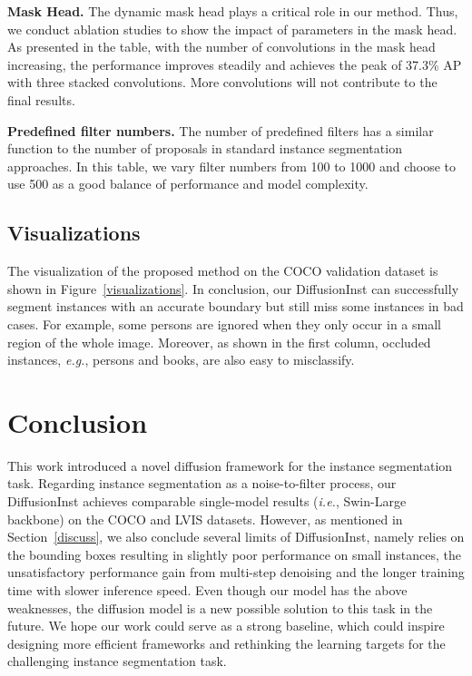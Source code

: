 \documentclass{article}
\begin{document}
\noindent\textbf{Mask Head.} The dynamic mask head plays a critical role in our method. Thus, we conduct ablation studies to show the impact of parameters in the mask head. As presented in the table, with the number of convolutions in the mask head increasing, the performance improves steadily and achieves the peak of 37.3\% AP with three stacked convolutions. More convolutions will not contribute to the final results.



\noindent\textbf{Predefined filter numbers.} The number of predefined filters has a similar function to the number of proposals in standard instance segmentation approaches. In this table, we vary filter numbers from 100 to 1000 and choose to use 500 as a good balance of performance and model complexity.

\subsection{Visualizations}


The visualization of the proposed method on the COCO validation dataset is shown in Figure~\ref{visualizations}. In conclusion, our DiffusionInst can successfully segment instances with an accurate boundary but still miss some instances in bad cases. For example, some persons are ignored when they only occur in a small region of the whole image. Moreover, as shown in the first column, occluded instances, \emph{e.g.}, persons and books, are also easy to misclassify.



\section{Conclusion}
This work introduced a novel diffusion framework for the instance segmentation task. Regarding instance segmentation as a noise-to-filter process, our DiffusionInst achieves comparable single-model results ({\em i.e.}, Swin-Large backbone) on the COCO and LVIS datasets. However, as mentioned in Section~\ref{discuss}, we also conclude several limits of DiffusionInst, namely relies on the bounding boxes resulting in slightly poor performance on small instances, the unsatisfactory performance gain from multi-step denoising and the longer training time with slower inference speed.
Even though our model has the above weaknesses, the diffusion model is a new possible solution to this task in the future. We hope our work could serve as a strong baseline, which could inspire designing more efficient frameworks and rethinking the learning targets for the challenging instance segmentation task.






\end{document}
